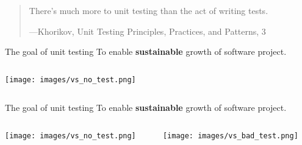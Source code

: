 \documentclass[english,10pt,aspectratio=169]{beamer}
\title{\large\presentationtitle}
\author{\textbf{
	<Name>
}}
\date{}
\begin{document}


\begin{frame}
	\titlepage
\end{frame}

\begin{frame}
	\begin{quote}
		There's much more to unit testing than the act of writing tests.
		\begin{flushright}
			\tiny{---Khorikov, \textup{Unit Testing Principles, Practices, and Patterns}, 3}
		\end{flushright}
	\end{quote}
\end{frame}

\begin{frame}{The goal of unit testing}
	To enable \textbf{sustainable} growth of software project.
	\begin{columns}[T]
		\begin{column}{0.5\textwidth}
			\texttt{[image: images/vs\_no\_test.png]}
		\end{column}
		\begin{column}{0.5\textwidth}
		\end{column}
	\end{columns}
\end{frame}

\begin{frame}{The goal of unit testing}
	To enable \textbf{sustainable} growth of software project.
	\begin{columns}[T]
		\begin{column}{0.5\textwidth}
			\texttt{[image: images/vs\_no\_test.png]}
		\end{column}
		\begin{column}{0.5\textwidth}
			\texttt{[image: images/vs\_bad\_test.png]}
		\end{column}
	\end{columns}
\end{frame}
\end{document}
